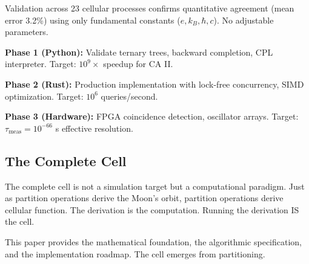 \documentclass[11pt,a4paper]{article}
\theoremstyle{remark}
\begin{document}
Validation across 23 cellular processes confirms quantitative agreement (mean error 3.2\%) using only fundamental constants ($e, k_B, \hbar, c$). No adjustable parameters.

\textbf{Phase 1 (Python):} Validate ternary trees, backward completion, CPL interpreter. Target: $10^9\times$ speedup for CA II.

\textbf{Phase 2 (Rust):} Production implementation with lock-free concurrency, SIMD optimization. Target: $10^6$ queries/second.

\textbf{Phase 3 (Hardware):} FPGA coincidence detection, oscillator arrays. Target: $\tau_{\text{meas}} = 10^{-66}$ s effective resolution.

\subsection{The Complete Cell}

The complete cell is not a simulation target but a computational paradigm. Just as partition operations derive the Moon's orbit, partition operations derive cellular function. The derivation is the computation. Running the derivation IS the cell.

This paper provides the mathematical foundation, the algorithmic specification, and the implementation roadmap. The cell emerges from partitioning.



\end{document}
